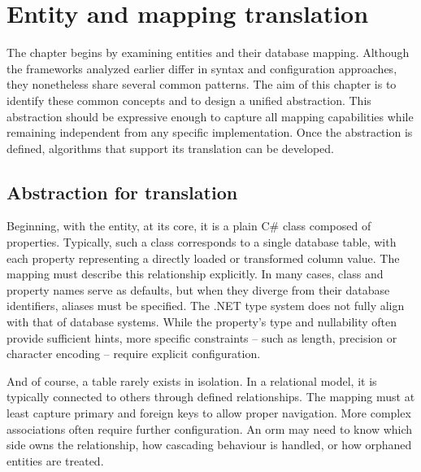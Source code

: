 \chapter{Entity and mapping translation}

The chapter begins by examining entities and their database mapping. Although the frameworks analyzed earlier differ in syntax and configuration approaches, they nonetheless share several common patterns. The aim of this chapter is to identify these common concepts and to design a unified abstraction. This abstraction should be expressive enough to capture all mapping capabilities while remaining independent from any specific implementation. Once the abstraction is defined, algorithms that support its translation can be developed.

\section{Abstraction for translation}\label{sec:def_abstract}

Beginning, with the entity, at its core, it is a plain C\# class composed of properties. Typically, such a class corresponds to a single database table, with each property representing a directly loaded or transformed column value. The mapping must describe this relationship explicitly. In many cases, class and property names serve as defaults, but when they diverge from their database identifiers, aliases must be specified. The .NET type system does not fully align with that of database systems. While the property's type and nullability often provide sufficient hints, more specific constraints -- such as length, precision or character encoding -- require explicit configuration.

And of course, a table rarely exists in isolation. In a relational model, it is typically connected to others through defined relationships. The mapping must at least capture primary and foreign keys to allow proper navigation. More complex associations often require further configuration. An \acrshort{orm} may need to know which side owns the relationship, how cascading behaviour is handled, or how orphaned entities are treated.


